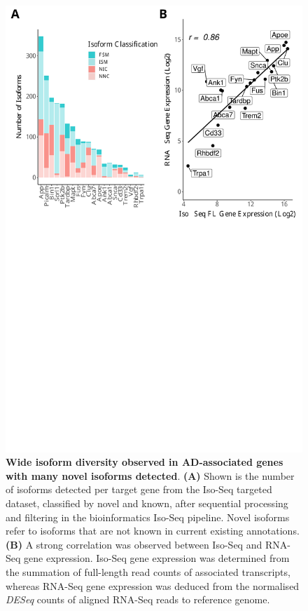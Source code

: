 \begin{figure}[!htp]
	\begin{center}
		\includegraphics[page=1,trim={0 20cm 0 0cm},clip,scale = 0.60]{Figures/ONTvsIsoSeq.pdf}
	\end{center}
	\captionsetup{width=0.95\textwidth}
	\caption[Wide isoform diversity in AD-associated genes from Targeted Sequencing in mouse cortex]%
	{\textbf{Wide isoform diversity observed in AD-associated genes with many novel isoforms detected}. \textbf{(A)} Shown is the number of isoforms detected per target gene from the Iso-Seq targeted dataset, classified by novel and known, after sequential processing and filtering in the bioinformatics Iso-Seq pipeline. Novel isoforms refer to isoforms that are not known in current existing annotations. \textbf{(B)} A strong correlation was observed between Iso-Seq and RNA-Seq gene expression. Iso-Seq gene expression was determined from the summation of full-length read counts of associated transcripts, whereas RNA-Seq gene expression was deduced from the normalised \textit{DESeq} counts of aligned RNA-Seq reads to reference genome\cite{Castanho2020}.}
	\label{fig:isoseq_targeted_finalnumberiso}
\end{figure}


